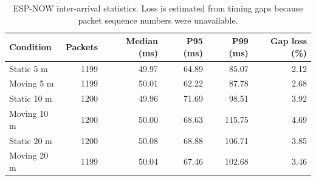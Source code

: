 \begin{table}[!t]
\centering
\caption{ESP-NOW inter-arrival statistics. Loss is estimated from timing gaps because packet sequence numbers were unavailable.}
\label{tab:espnow}
\begin{tabular}{lrrrrr}
\hline
Condition & Packets & Median (ms) & P95 (ms) & P99 (ms) & Gap loss (\%) \\
\hline
Static 5 m & 1199 & 49.97 & 64.89 & 85.07 & 2.12 \\
Moving 5 m & 1199 & 50.01 & 62.22 & 87.78 & 2.68 \\
Static 10 m & 1200 & 49.96 & 71.69 & 98.51 & 3.92 \\
Moving 10 m & 1200 & 50.00 & 68.63 & 115.75 & 4.69 \\
Static 20 m & 1200 & 50.08 & 68.88 & 106.71 & 3.85 \\
Moving 20 m & 1199 & 50.04 & 67.46 & 102.68 & 3.46 \\
\hline
\end{tabular}
\end{table}
